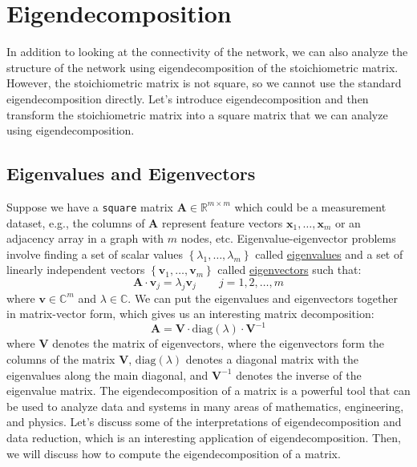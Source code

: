 \documentclass{article}[11pt]
\begin{document}
\section{Eigendecomposition}
In addition to looking at the connectivity of the network, we can also analyze the structure of the network using eigendecomposition of the stoichiometric matrix. However, the stoichiometric matrix is not square, so we cannot use the standard eigendecomposition directly. 
Let's introduce eigendecomposition and then transform the stoichiometric matrix into a square matrix that we can analyze using eigendecomposition.

\subsection{Eigenvalues and Eigenvectors}
Suppose we have a \texttt{square} matrix $\mathbf{A}\in\mathbb{R}^{m\times{m}}$ which could be a measurement dataset, e.g., the columns of $\mathbf{A}$ represent feature 
vectors $\mathbf{x}_{1},\dots,\mathbf{x}_{m}$ or an adjacency array in a graph with $m$ nodes, etc. Eigenvalue-eigenvector problems involve finding a set of scalar values $\left\{\lambda_{1},\dots,\lambda_{m}\right\}$ called 
\href{https://mathworld.wolfram.com/Eigenvalue.html}{eigenvalues} and a set of linearly independent vectors 
$\left\{\mathbf{v}_{1},\dots,\mathbf{v}_{m}\right\}$ called \href{https://mathworld.wolfram.com/Eigenvector.html}{eigenvectors} such that:
\begin{equation}
\mathbf{A}\cdot\mathbf{v}_{j} = \lambda_{j}\mathbf{v}_{j}\qquad{j=1,2,\dots,m}
\end{equation}
where $\mathbf{v}\in\mathbb{C}^{m}$ and $\lambda\in\mathbb{C}$. We can put the eigenvalues and eigenvectors together in matrix-vector form, which gives us an interesting matrix decomposition:
\begin{equation}
\mathbf{A} = \mathbf{V}\cdot\text{diag}(\lambda)\cdot\mathbf{V}^{-1}
\end{equation}
where $\mathbf{V}$ denotes the matrix of eigenvectors, where the eigenvectors form the columns of the matrix $\mathbf{V}$, $\text{diag}(\lambda)$ denotes a diagonal matrix with the eigenvalues along the main diagonal, 
and $\mathbf{V}^{-1}$ denotes the inverse of the eigenvalue matrix.
The eigendecomposition of a matrix is a powerful tool that can be used to analyze data and systems in many areas of mathematics, engineering, and physics.
Let's discuss some of the interpretations of eigendecomposition and data reduction, which is an interesting application of eigendecomposition. Then, we will discuss how to compute the eigendecomposition of a matrix.
\end{document}
